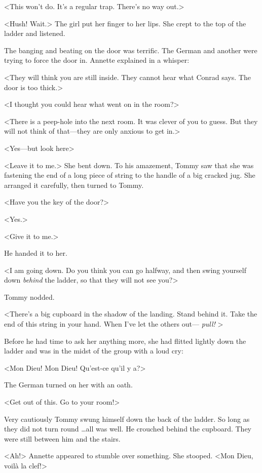 <This won't do. It's a regular trap. There's no way out.>

<Hush! Wait.> The girl put her finger to her lips. She crept to the top of the ladder and listened.

The banging and beating on the door was terrific. The German and another were trying to force the door in. Annette explained in a whisper:

<They will think you are still inside. They cannot hear what Conrad says. The door is too thick.>

<I thought you could hear what went on in the room?>

<There is a peep-hole into the next room. It was clever of you to guess. But they will not think of that—they are only anxious to get in.>

<Yes—but look here\longdash>

<Leave it to me.> She bent down. To his amazement, Tommy saw that she was fastening the end of a long piece of string to the handle of a big cracked jug. She arranged it carefully, then turned to Tommy.

<Have you the key of the door?>

<Yes.>

<Give it to me.>

He handed it to her.

<I am going down. Do you think you can go halfway, and then swing yourself down \emph{behind} the ladder, so that they will not see you?>

Tommy nodded.

<There's a big cupboard in the shadow of the landing. Stand behind it. Take the end of this string in your hand. When I've let the others out— \emph{pull! }>

Before he had time to ask her anything more, she had flitted lightly down the ladder and was in the midst of the group with a loud cry:

<Mon Dieu! Mon Dieu! Qu'est-ce qu'il y a?>

The German turned on her with an oath.

<Get out of this. Go to your room!>

Very cautiously Tommy swung himself down the back of the ladder. So long as they did not turn round \dots all was well. He crouched behind the cupboard. They were still between him and the stairs.

<Ah!> Annette appeared to stumble over something. She stooped. <Mon Dieu, voilà la clef!>

